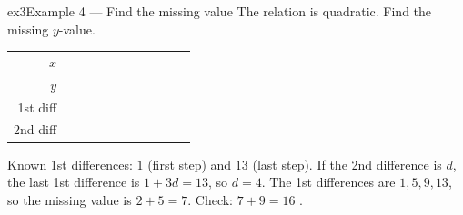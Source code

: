 \documentclass[11pt]{article}
\begin{document}
\begin{example}{ex3}{Example 4 --- Find the missing value}
The relation is quadratic. Find the missing $y$-value.
\begin{center}\renewcommand{\arraystretch}{1.15}\setlength{\tabcolsep}{2pt}\begin{tabular}{r|>{\centering\arraybackslash}p{0.62cm}>{\centering\arraybackslash}p{0.62cm}>{\centering\arraybackslash}p{0.62cm}>{\centering\arraybackslash}p{0.62cm}>{\centering\arraybackslash}p{0.62cm}>{\centering\arraybackslash}p{0.62cm}>{\centering\arraybackslash}p{0.62cm}>{\centering\arraybackslash}p{0.62cm}>{\centering\arraybackslash}p{0.62cm}>{\centering\arraybackslash}p{0.62cm}}
$x$ & \multicolumn{2}{c}{\colorbox{iagreen}{\makebox[1.12cm]{\strut \color{white}\bfseries $0$}}} & \multicolumn{2}{c}{\colorbox{iagreen}{\makebox[1.12cm]{\strut \color{white}\bfseries $1$}}} & \multicolumn{2}{c}{\colorbox{iagreen}{\makebox[1.12cm]{\strut \color{white}\bfseries $2$}}} & \multicolumn{2}{c}{\colorbox{iagreen}{\makebox[1.12cm]{\strut \color{white}\bfseries $3$}}} & \multicolumn{2}{c}{\colorbox{iagreen}{\makebox[1.12cm]{\strut \color{white}\bfseries $4$}}} \\[2pt]
$y$ & \multicolumn{2}{c}{\colorbox{keybg}{\makebox[1.12cm]{\strut $1$}}} & \multicolumn{2}{c}{\colorbox{keybg}{\makebox[1.12cm]{\strut $2$}}} & \multicolumn{2}{c}{\fbox{\makebox[0.94cm]{\strut}}} & \multicolumn{2}{c}{\colorbox{keybg}{\makebox[1.12cm]{\strut $16$}}} & \multicolumn{2}{c}{\colorbox{keybg}{\makebox[1.12cm]{\strut $29$}}} \\[2pt]
\textcolor{exblue}{\scriptsize 1st diff} & & \multicolumn{2}{c}{\colorbox{exbg}{\makebox[1.12cm]{\strut \textcolor{exblue}{$+1$}}}} & \multicolumn{2}{c}{\colorbox{exbg}{\makebox[1.12cm]{\strut \textcolor{exblue}{$+5$}}}} & \multicolumn{2}{c}{\colorbox{exbg}{\makebox[1.12cm]{\strut \textcolor{exblue}{$+9$}}}} & \multicolumn{2}{c}{\colorbox{exbg}{\makebox[1.12cm]{\strut \textcolor{exblue}{$+13$}}}} & \\[2pt]
\textcolor{qorange}{\scriptsize 2nd diff} & & & \multicolumn{2}{c}{\colorbox{qbg}{\makebox[1.12cm]{\strut \textcolor{qorange!70!black}{$+4$}}}} & \multicolumn{2}{c}{\colorbox{qbg}{\makebox[1.12cm]{\strut \textcolor{qorange!70!black}{$+4$}}}} & \multicolumn{2}{c}{\colorbox{qbg}{\makebox[1.12cm]{\strut \textcolor{qorange!70!black}{$+4$}}}} & & \\
\end{tabular}\end{center}
\soln Known 1st differences: $1$ (first step) and $13$ (last step). If the 2nd difference is $d$, the last 1st difference is $1+3d=13$, so $d=4$. The 1st differences are $1,5,9,13$, so the missing value is $2+5=7$. Check: $7+9=16$ \checkmark.
\end{example}
\end{document}
